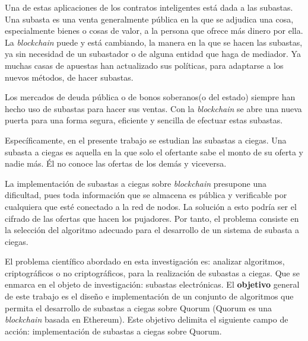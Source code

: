   Una de estas aplicaciones de los contratos inteligentes está dada a las subastas. Una subasta es una venta generalmente pública en la 
  que se adjudica una cosa, especialmente bienes o cosas de valor, a la persona que ofrece más dinero por ella. La \textit{blockchain} puede y 
  está cambiando, la manera en la que se hacen las subastas, ya sin necesidad de un subastador o de alguna entidad que haga de mediador. 
  Ya muchas casas de apuestas han actualizado sus políticas, para adaptarse a los nuevos métodos, de hacer subastas. 

  Los mercados de deuda pública o de bonos soberanos(o del estado) siempre han hecho uso de subastas para hacer sus ventas. Con la
  \textit{blockchain} se abre una nueva puerta para una forma segura, eficiente y sencilla de efectuar estas subastas. 

  Específicamente, en el presente trabajo se estudian las subastas a ciegas. Una subasta a ciegas es aquella en la que solo el ofertante 
  sabe el monto de su oferta y nadie más. Él no conoce las ofertas de los demás y viceversa.

  La implementación de subastas a ciegas sobre \textit{blockchain} presupone una dificultad, pues toda información que se almacena es pública y 
  verificable por cualquiera que esté conectado a la red de nodos. La solución a esto podría ser el cifrado de las ofertas que hacen 
  los pujadores. Por tanto, el problema consiste en la selección del algoritmo adecuado para el desarrollo de un sistema de 
  subasta a ciegas.

  El problema científico abordado en esta investigación es: analizar algoritmos, criptográficos o no 
  criptográficos, para la 
  realización de subastas a ciegas. Que se enmarca en el objeto de investigación: subastas electrónicas. 
  El \textbf{objetivo} general de 
  este trabajo es el diseño e implementación de un conjunto de algoritmos que permita el desarrollo de 
  subastas a ciegas sobre Quorum 
  (Quorum es una \textit{blockchain} basada en Ethereum). Este objetivo delimita el siguiente campo de 
  acción: implementación de subastas a ciegas sobre Quorum.

